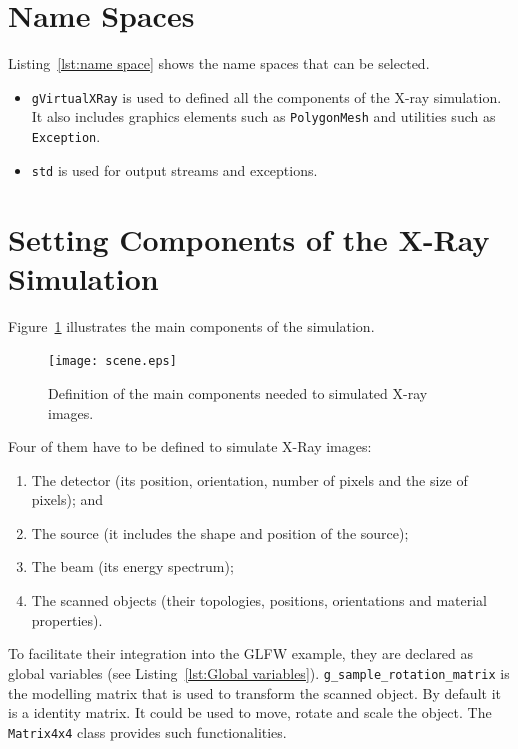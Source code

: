 \documentclass[11pt,oneside,a4paper,final]{article}
\begin{document}
\section{Name Spaces}
\label{sec:Name Spaces}



Listing~\ref{lst:name space} shows the name spaces that can be selected. 
\begin{itemize}
 \item \verb+gVirtualXRay+ is used to defined all the components of the X-ray simulation. 
 	It also includes graphics elements such as \verb+PolygonMesh+ and utilities such as \verb+Exception+. 
 \item \verb+std+ is used for output streams and exceptions.
\end{itemize}


\section{Setting Components of the X-Ray Simulation}
\label{sec:Setting Components of the X-Ray Simulation}

Figure~\ref{fig:scene} illustrates the main components of the simulation. 
\begin{figure}[tbh]
 \centering
 \texttt{[image: scene.eps]}
 \caption{\label{fig:scene} Definition of the main components needed to simulated X-ray images.}
\end{figure}



Four of them have to be defined to simulate X-Ray images:
\begin{enumerate}
 \item The detector (its position, orientation, number of pixels and the size of pixels); and
 \item The source (it includes the shape and position of the source);
 \item The beam (its energy spectrum);
 \item The scanned objects (their topologies, positions, orientations and material properties).
\end{enumerate}

To facilitate their integration into the GLFW example, they are declared as global variables (see Listing~\ref{lst:Global variables}).
\verb+g_sample_rotation_matrix+ is the modelling matrix that is used to transform the scanned object. 
By default it is a identity matrix. 
It could be used to move, rotate and scale the object. 
The \verb+Matrix4x4+ class provides such functionalities. 
\end{document}

